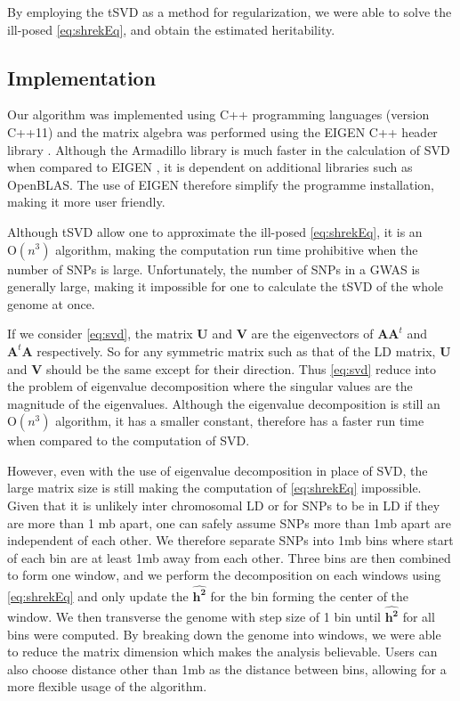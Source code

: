 			By employing the \gls{tSVD} as a method for regularization, we were able to solve the ill-posed \cref{eq:shrekEq}, and obtain the estimated heritability.
		\subsection{Implementation}
			Our algorithm was implemented using C++ programming languages (version C++11) and the matrix algebra was performed using the EIGEN C++ header library \citep{eigenweb}.
			Although the Armadillo library \citep{Sanderson2010} is much faster in the calculation of \gls{SVD} when compared to EIGEN \citep{Ho2011}, it is dependent on additional libraries such as OpenBLAS. 
			The use of EIGEN therefore simplify the programme installation, making it more user friendly. 
			
			Although \gls{tSVD} allow one to approximate the ill-posed \cref{eq:shrekEq}, it is an $\mathrm{O}(n^3)$ algorithm, making the computation run time prohibitive when the number of \glspl{SNP} is large.
			Unfortunately, the number of \glspl{SNP} in a \gls{GWAS} is generally large, making it impossible for one to calculate the \gls{tSVD} of the whole genome at once. 
			
			If we consider \cref{eq:svd}, the matrix $\boldsymbol{U}$ and $\boldsymbol{V}$ are the eigenvectors of $\boldsymbol{AA}^t$ and $\boldsymbol{A}^t\boldsymbol{A}$ respectively. 
			So for any symmetric matrix such as that of the \gls{LD} matrix, $\boldsymbol{U}$ and $\boldsymbol{V}$ should be the same except for their direction. 
			Thus \cref{eq:svd} reduce into the problem of eigenvalue decomposition where the singular values are the magnitude of the eigenvalues. 
			Although the eigenvalue decomposition is still an $\mathrm{O}(n^3)$ algorithm, it has a smaller constant, therefore has a faster run time when compared to the computation of \gls{SVD}. 
			
			However, even with the use of eigenvalue decomposition in place of \gls{SVD}, the large matrix size is still making the computation of \cref{eq:shrekEq} impossible. 
			Given that it is unlikely inter chromosomal \gls{LD} or for \glspl{SNP} to be in \gls{LD} if they are more than 1 \gls{mb} apart, one can safely assume \glspl{SNP} more than 1\gls{mb} apart are independent of each other. 
			We therefore separate \glspl{SNP} into 1\gls{mb} bins where start of each bin are at least 1\gls{mb} away from each other. 
			Three bins are then combined to form one window, and we perform the decomposition on each windows using \cref{eq:shrekEq} and only update the $\boldsymbol{\hat{h^2}}$ for the bin forming the center of the window.
			We then transverse the genome with step size of 1 bin until $\boldsymbol{\hat{h^2}}$ for all bins were computed. 
			By breaking down the genome into windows, we were able to reduce the matrix dimension which makes the analysis believable.
			Users can also choose distance other than 1\gls{mb} as the distance between bins, allowing for a more flexible usage of the algorithm.
			
